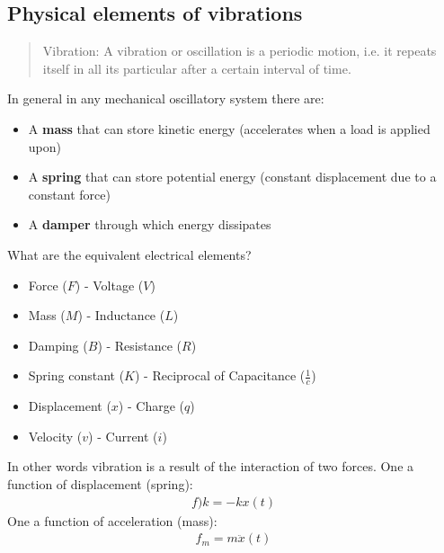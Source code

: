 \documentclass[class=report, crop=false, 12pt,a4paper]{standalone}
\begin{document}
\subsection{Physical elements of vibrations}
\begin{quotation}
    Vibration: A vibration or oscillation is a periodic motion, i.e. it repeats itself in all its particular after a certain interval of time.
\end{quotation}
In general in any mechanical oscillatory system there are:
\begin{itemize}
    \item A \textbf{mass} that can store kinetic energy (accelerates when a load is applied upon)
    \item A \textbf{spring} that can store potential energy (constant displacement due to a constant force)
    \item A \textbf{damper} through which energy dissipates
\end{itemize}
What are the equivalent electrical elements?
\begin{itemize}
    \item Force ($F$) - Voltage ($V$)
    \item Mass ($M$) - Inductance ($L$)
    \item Damping ($B$) - Resistance ($R$)
    \item Spring constant ($K$) - Reciprocal of Capacitance ($\frac{1}{c}$)
    \item Displacement ($x$) - Charge ($q$)
    \item Velocity ($v$) - Current ($i$)
\end{itemize}
In other words vibration is a result of the interaction of two forces. One a function of displacement (spring):
\begin{gather}
    f)k = - kx(t)
\end{gather}
One a function of acceleration (mass):
\begin{gather}
    f_m = m \ddot{x} (t)
\end{gather}
\end{document}
